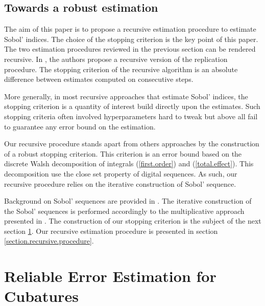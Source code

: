 \documentclass[]{elsarticle}
\theoremstyle{definition}
\begin{document}
\subsection{Towards a robust estimation}
The aim of this paper is to propose a recursive estimation procedure to estimate Sobol' indices. The choice of the stopping criterion is the key point of this paper. The two estimation procedures reviewed in the previous section can be rendered recursive. In \cite{Gilquin16}, the authors propose a recursive version of the replication procedure. The stopping criterion of the recursive algorithm is an absolute difference between estimates computed on consecutive steps. 

More generally, in most recursive approaches that estimate Sobol' indices, the stopping criterion is a quantity of interest build directly upon the estimates. Such stopping criteria often involved hyperparameters hard to tweak but above all fail to guarantee any error bound on the estimation. 
\bigskip

Our recursive procedure stands apart from others approaches by the construction of a robust stopping criterion. This criterion is an error bound based on the discrete Walsh decomposition of integrals (\ref{first.order}) and (\ref{total.effect}). This decomposition use the close set property of digital sequences. As such, our recursive procedure relies on the iterative construction of Sobol' sequence. 

Background on Sobol' sequences are provided in \cite{crass}. The iterative construction of the Sobol' sequences is performed accordingly to the multiplicative  approach presented in \cite{crass}. The construction of our stopping criterion is the subject of the next section \ref{section.error}. Our recursive estimation procedure is presented in section \ref{section.recursive.procedure}.


\section{Reliable Error Estimation for Cubatures}
\label{section.error} 
\end{document}

